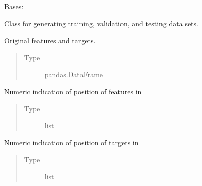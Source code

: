 \documentclass[a4paper,10pt,english]{sphinxmanual}
\begin{document}
\begin{fulllineitems}
\label{\detokenize{api/ucf.TrainingDataSets:ucf.TrainingDataSets}}
Bases: 

Class for generating training, validation, and testing data sets.

\begin{fulllineitems}
\label{\detokenize{api/ucf.TrainingDataSets:ucf.TrainingDataSets.original_data}}
Original features and targets.
\begin{quote}\begin{description}
\item[{Type}] \leavevmode
pandas.DataFrame

\end{description}\end{quote}

\end{fulllineitems}


\begin{fulllineitems}
\label{\detokenize{api/ucf.TrainingDataSets:ucf.TrainingDataSets.indices_of_features}}
Numeric indication of position of features in 
\begin{quote}\begin{description}
\item[{Type}] \leavevmode
list

\end{description}\end{quote}

\end{fulllineitems}


\begin{fulllineitems}
\label{\detokenize{api/ucf.TrainingDataSets:ucf.TrainingDataSets.indices_of_targets}}
Numeric indication of position of targets in 
\begin{quote}\begin{description}
\item[{Type}] \leavevmode
list


\end{description}
\end{quote}
\end{fulllineitems}
\end{fulllineitems}
\end{document}
